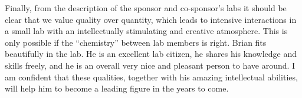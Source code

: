 \documentclass[11pt,notitlepage]{article}
\begin{document}
Finally, from the description of the sponsor and co-sponsor's labs it
should be clear that we value quality over quantity, which leads to
intensive interactions in a small lab with an intellectually
stimulating and creative atmosphere. This is only possible if the
``chemistry'' between lab members is right. Brian fits beautifully in
the lab. He is an excellent lab citizen, he shares his knowledge and
skills freely, and he is an overall very nice and pleasant person to have
around. I am confident that these qualities, together with his amazing
intellectual abilities, will help him to become a leading figure in
the years to come.

\clearpage

%
% 

%

\end{document}
